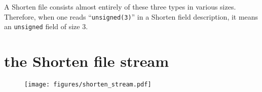 A Shorten file consists almost entirely of these three types
in various sizes.
Therefore, when one reads ``\texttt{unsigned(3)}'' in a Shorten field
description, it means an \texttt{unsigned} field of size 3.

\pagebreak

\section{the Shorten file stream}
\begin{figure}[h]
\texttt{[image: figures/shorten\_stream.pdf]}
\end{figure}
\par
\noindent

